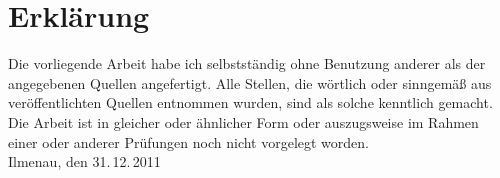 %
%
%
%

\chapter*{Erklärung}

Die vorliegende Arbeit habe ich selbstständig ohne Benutzung anderer als der
angegebenen Quellen angefertigt. Alle Stellen, die wörtlich oder sinngemäß
aus veröffentlichten Quellen entnommen wurden, sind als solche
kenntlich gemacht. Die Arbeit ist in gleicher oder ähnlicher Form oder
auszugsweise im Rahmen einer oder anderer Prüfungen noch nicht vorgelegt
worden.
\\[2cm]
Ilmenau, den 31.\,12.\,2011\hfill \namedesautors
